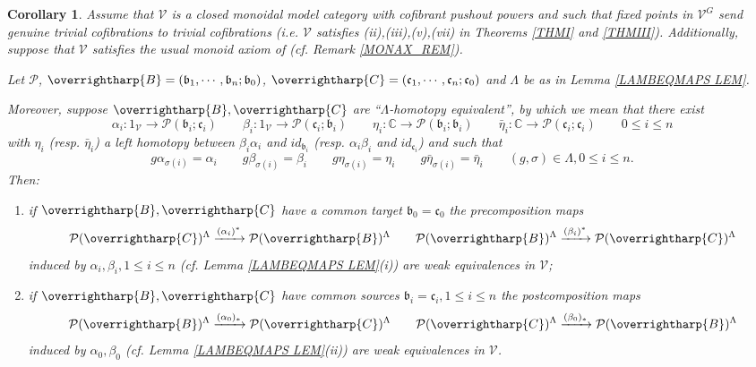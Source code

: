 \documentclass[a4paper,10pt
,draft
]{article}%
\numberwithin{equation}{section}
\numberwithin{figure}{section}
\newtheorem{corollary}[equation]{Corollary}%
\theoremstyle{definition} %
\newcommand{\vect}[1]{\text{\overrightharp{\ensuremath{#1}}}}
\newcommand{\V}{\ensuremath{\mathcal V}}
\renewcommand{\P}{\ensuremath{\mathcal P}}
\newcommand{\1}{\ensuremath{\mathbbm 1}}%
\begin{document}
\begin{corollary}\label{ALBEETA COR}
Assume that
$\V$ is a closed monoidal model category with cofibrant pushout powers and such that fixed points in $\V^G$ send genuine trivial cofibrations to trivial cofibrations
(i.e. $\V$ satisfies (ii),(iii),(v),(vii) in Theorems \ref{THMI} and \ref{THMIII}). Additionally, suppose 
that $\V$ satisfies the usual monoid axiom of \cite{SS00} (cf. Remark \ref{MONAX_REM}).
      
Let $\P$, 
$\vect{B}=(\mathfrak{b}_1,\cdots,\mathfrak{b}_n;\mathfrak{b}_0)$,
$\vect{C}=(\mathfrak{c}_1,\cdots,\mathfrak{c}_n;\mathfrak{c}_0)$ 
and $\Lambda$ be as in 
Lemma \ref{LAMBEQMAPS LEM}.

Moreover, suppose 
$\vect{B},\vect{C}$
are ``$\Lambda$-homotopy equivalent'',
by which we mean that there exist 
\[
\alpha_i \colon 1_{\V} \to \P(\mathfrak{b}_i;\mathfrak{c}_i)
\qquad 
\beta_i \colon 1_{\V} \to \P(\mathfrak{c}_i;\mathfrak{b}_i)
\qquad
\eta_i \colon \mathbb{C} \to \P(\mathfrak{b}_i;\mathfrak{b}_i)
\qquad
\bar{\eta}_i \colon \mathbb{C} \to \P(\mathfrak{c}_i;\mathfrak{c}_i)
\qquad
0\leq i \leq n
\] 
with $\eta_i$ (resp. $\bar{\eta}_i$) a left homotopy between 
$\beta_i\alpha_i$ and $id_{\mathfrak{b}_i}$
(resp. 
$\alpha_i\beta_i$ and $id_{\mathfrak{c}_i}$)
and such that
\[
g \alpha_{\sigma(i)} = \alpha_i \qquad
g \beta_{\sigma(i)} = \beta_i \qquad
g \eta_{\sigma(i)} = \eta_i \qquad
g \bar{\eta}_{\sigma(i)} = \bar{\eta}_i \qquad
(g,\sigma) \in \Lambda,0\leq i \leq n.
\]
Then:
\begin{enumerate}[label=(\roman*)]
\item if $\vect{B},\vect{C}$ have a common target $\mathfrak{b}_0=\mathfrak{c}_0$ the precomposition maps
\[
\P(\vect{C})^{\Lambda} \xrightarrow{(\alpha_i)^{\**}} \P(\vect{B})^{\Lambda}
\qquad
\P(\vect{B})^{\Lambda} \xrightarrow{(\beta_i)^{\**}}
\P(\vect{C})^{\Lambda}
\]
induced by $\alpha_i,\beta_i,1\leq i \leq n$ 
(cf. Lemma \ref{LAMBEQMAPS LEM}(i)) are weak equivalences in $\V$;
\item if $\vect{B},\vect{C}$ have common sources $\mathfrak{b}_i=\mathfrak{c}_i, 1 \leq i \leq n$ the postcomposition maps
\[
\P(\vect{B})^{\Lambda} \xrightarrow{(\alpha_0)_{\**}}
\P(\vect{C})^{\Lambda}
\qquad
\P(\vect{C})^{\Lambda} \xrightarrow{(\beta_0)_{\**}}
\P(\vect{B})^{\Lambda}
\]
induced by $\alpha_0,\beta_0$
(cf. Lemma \ref{LAMBEQMAPS LEM}(ii))
are weak equivalences in $\V$.
\end{enumerate}
\end{corollary}
\end{document}
